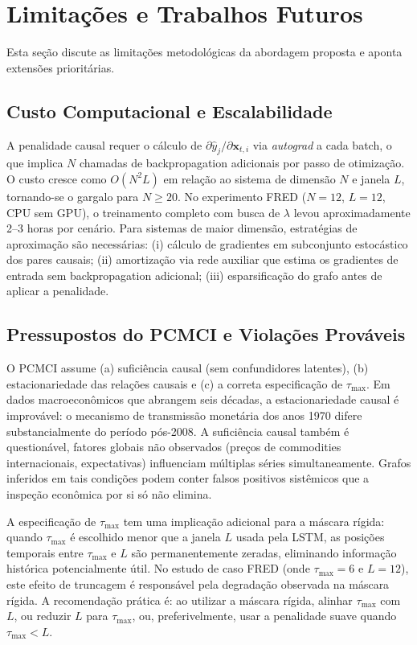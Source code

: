 \documentclass[12pt, a4paper]{article}
\begin{document}
\section{Limitações e Trabalhos Futuros}

Esta seção discute as limitações metodológicas da abordagem proposta e aponta extensões prioritárias.

\subsection{Custo Computacional e Escalabilidade}

A penalidade causal requer o cálculo de $\partial \hat{y}_j / \partial \mathbf{x}_{t,i}$ via \emph{autograd} a cada batch, o que implica $N$ chamadas de backpropagation adicionais por passo de otimização. O custo cresce como $O(N^2 L)$ em relação ao sistema de dimensão $N$ e janela $L$, tornando-se o gargalo para $N \geq 20$. No experimento FRED ($N=12$, $L=12$, CPU sem GPU), o treinamento completo com busca de $\lambda$ levou aproximadamente 2--3 horas por cenário. Para sistemas de maior dimensão, estratégias de aproximação são necessárias: (i) cálculo de gradientes em subconjunto estocástico dos pares causais; (ii) amortização via rede auxiliar que estima os gradientes de entrada sem backpropagation adicional; (iii) esparsificação do grafo antes de aplicar a penalidade.

\subsection{Pressupostos do PCMCI e Violações Prováveis}

O PCMCI assume (a) suficiência causal (sem confundidores latentes), (b) estacionariedade das relações causais e (c) a correta especificação de $\tau_{\max}$. Em dados macroeconômicos que abrangem seis décadas, a estacionariedade causal é improvável: o mecanismo de transmissão monetária dos anos 1970 difere substancialmente do período pós-2008. A suficiência causal também é questionável, fatores globais não observados (preços de commodities internacionais, expectativas) influenciam múltiplas séries simultaneamente. Grafos inferidos em tais condições podem conter falsos positivos sistêmicos que a inspeção econômica por si só não elimina.

A especificação de $\tau_{\max}$ tem uma implicação adicional para a máscara rígida: quando $\tau_{\max}$ é escolhido menor que a janela $L$ usada pela LSTM, as posições temporais entre $\tau_{\max}$ e $L$ são permanentemente zeradas, eliminando informação histórica potencialmente útil. No estudo de caso FRED (onde $\tau_{\max} = 6$ e $L = 12$), este efeito de truncagem é responsável pela degradação observada na máscara rígida. A recomendação prática é: ao utilizar a máscara rígida, alinhar $\tau_{\max}$ com $L$, ou reduzir $L$ para $\tau_{\max}$, ou, preferivelmente, usar a penalidade suave quando $\tau_{\max} < L$.
\end{document}
